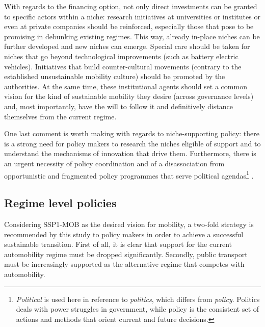 With regards to the financing option, not only direct investments can be granted to specific actors within a niche: research initiatives at universities or institutes or even at private companies should be reinforced, especially those that pose to be promising in debunking existing regimes. This way, already in-place niches can be further developed and new niches can emerge. Special care should be taken for niches that go beyond technological improvements (such as battery electric vehicles). Initiatives that build counter-cultural movements (contrary to the established unsustainable mobility culture) should be promoted by the authorities. At the same time, these institutional agents should set a common vision for the kind of sustainable mobility they desire (across governance levels) and, most importantly, have the will to follow it and definitively distance themselves from the current regime.

One last comment is worth making with regards to niche-supporting policy: there is a strong need for policy makers to research the niches eligible of support and to understand the mechanisms of innovation that drive them. Furthermore, there is an urgent necessity of policy coordination and of a disassociation from opportunistic and fragmented policy programmes that serve political agendas\footnote{\emph{Political} is used here in reference to \emph{politics}, which differs from \emph{policy}. Politics deals with power struggles in government, while policy is the consistent set of actions and methods that orient current and future decisions.} \parencite{kemp2004_ManagingTransitionSustainable}.

\subsection{Regime level policies}
\label{ss:results:policies_regime}
Considering SSP1-MOB as the desired vision for mobility, a two-fold strategy is recommended by this study to policy makers in order to achieve a successful sustainable transition. First of all, it is clear that support for the current automobility regime must be dropped significantly. Secondly, public transport must be increasingly supported as the alternative regime that competes with automobility.

